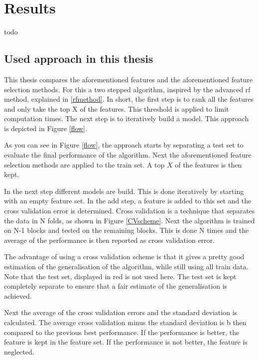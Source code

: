 \chapter{Results}
{\samenvatting todo}

\section{Used approach in this thesis}

This thesis compares the aforementioned features and the aforementioned feature selection methods. For this a two stepped algorithm, inspired by the advanced rf method, explained in \ref{rfmethod}. In short, the first step is to rank all the features and only take the top X of the features. This threshold is applied to limit computation times. The next step is to iteratively build a model. This approach is depicted in Figure \ref{flow}.


As you can see in Figure \ref{flow}, the approach starts by separating a test set to evaluate the final performance of the algorithm. Next the aforementioned feature selection methods are applied to the train set. A top $X$ of the features is then kept.

\npar

In the next step different models are build. This is done iteratively by starting with an empty feature set. In the add step, a feature is added to this set and the cross validation error is determined. Cross validation is a technique that separates the data in N folds, as shown in Figure \ref{CVscheme}. Next the algorithm is trained on N-1 blocks and tested on the remaining blocks. This is done N times and the average of the performance is then reported as cross validation error. 


The advantage of using a cross validation scheme is that it gives a pretty good estimation of the generalisation of the algorithm, while still using all train data. Note that the test set, displayed in red is not used here. The test set is kept completely separate to ensure that a fair estimate of the generalisation is achieved.

\npar

Next the average of the cross validation errors and the standard deviation is calculated. The average cross validation minus the standard deviation is b
then compared to the previous best performance. If the performance is better, the feature is kept in the feature set. If the performance is not better, the feature is neglected. 

